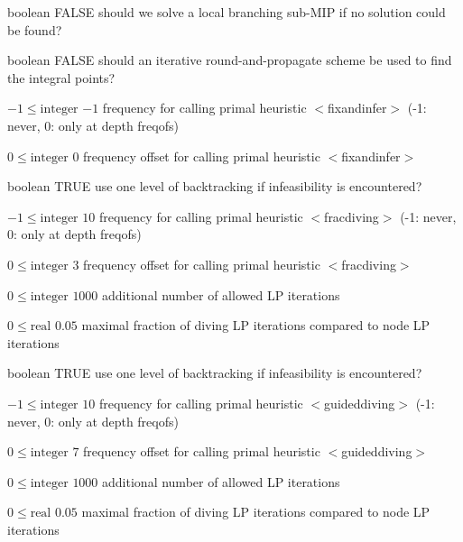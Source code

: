 %
{boolean}%
{FALSE}%
{should we solve a local branching sub-MIP if no solution could be found?}%
{}

%
{boolean}%
{FALSE}%
{should an iterative round-and-propagate scheme be used to find the integral points?}%
{}

%
{$-1\leq\textrm{integer}$}%
{$-1$}%
{frequency for calling primal heuristic $<$fixandinfer$>$ (-1: never, 0: only at depth freqofs)}%
{}

%
{$0\leq\textrm{integer}$}%
{$0$}%
{frequency offset for calling primal heuristic $<$fixandinfer$>$}%
{}

%
{boolean}%
{TRUE}%
{use one level of backtracking if infeasibility is encountered?}%
{}

%
{$-1\leq\textrm{integer}$}%
{$10$}%
{frequency for calling primal heuristic $<$fracdiving$>$ (-1: never, 0: only at depth freqofs)}%
{}

%
{$0\leq\textrm{integer}$}%
{$3$}%
{frequency offset for calling primal heuristic $<$fracdiving$>$}%
{}

%
{$0\leq\textrm{integer}$}%
{$1000$}%
{additional number of allowed LP iterations}%
{}

%
{$0\leq\textrm{real}$}%
{$0.05$}%
{maximal fraction of diving LP iterations compared to node LP iterations}%
{}

%
{boolean}%
{TRUE}%
{use one level of backtracking if infeasibility is encountered?}%
{}

%
{$-1\leq\textrm{integer}$}%
{$10$}%
{frequency for calling primal heuristic $<$guideddiving$>$ (-1: never, 0: only at depth freqofs)}%
{}

%
{$0\leq\textrm{integer}$}%
{$7$}%
{frequency offset for calling primal heuristic $<$guideddiving$>$}%
{}

%
{$0\leq\textrm{integer}$}%
{$1000$}%
{additional number of allowed LP iterations}%
{}

%
{$0\leq\textrm{real}$}%
{$0.05$}%
{maximal fraction of diving LP iterations compared to node LP iterations}%
{}

